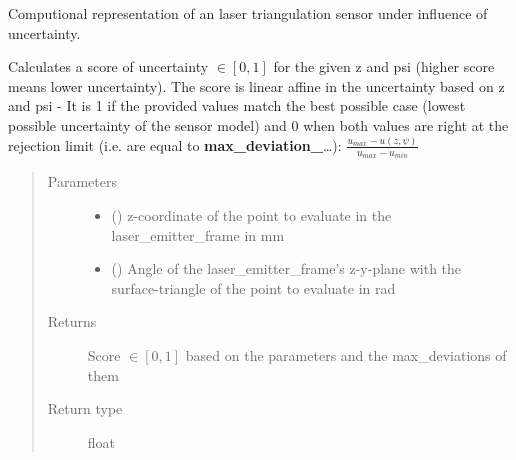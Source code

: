 \documentclass[letterpaper,10pt,english]{sphinxmanual}
\begin{document}
\begin{fulllineitems}
\label{\detokenize{module_sensor_model:agiprobot_measurement.sensor_model.SensorModel}}
Computional representation of an laser triangulation sensor under influence of uncertainty.

\begin{fulllineitems}
\label{\detokenize{module_sensor_model:agiprobot_measurement.sensor_model.SensorModel.evaluate_score}}
Calculates a score of uncertainty \(\in [0,1]\) for the given z and psi (higher score means lower uncertainty). The score
is linear affine in the uncertainty based on z and psi - It is 1 if the provided values match the best possible case (lowest
possible uncertainty of the sensor model) and 0 when both values are right at the rejection limit (i.e. are equal to {\color{red}\bfseries{}max\_deviation\_}…):
\(\frac{u_{max} - u(z, \psi)}{u_{max} - u_{min}}\)
\begin{quote}\begin{description}
\item[{Parameters}] \leavevmode\begin{itemize}
\item {} 
 () \textendash{} z-coordinate of the point to evaluate in the laser\_emitter\_frame in mm

\item {} 
 () \textendash{} Angle of the laser\_emitter\_frame’s z-y-plane with the surface-triangle of the point to evaluate in rad

\end{itemize}

\item[{Returns}] \leavevmode
Score \(\in [0,1]\) based on the parameters and the max\_deviations of them

\item[{Return type}] \leavevmode
float

\end{description}\end{quote}

\end{fulllineitems}


\end{fulllineitems}
\end{document}
